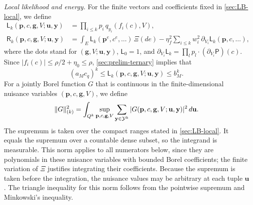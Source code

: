 \emph{Local likelihood and energy.} For the finite vectors and
coefficients fixed in \cref{sec:LB-local}, we define
\begin{align}
 \mathsf L_k(\mathbf p,c,\mathbf g,V;\mathbf u,\mathbf y)
 &=\prod_{i\le k}p_i\,q_{y_i}(f_i(c),V),
 \label{eq:LB-chart}\\
 \mathsf R_k(\mathbf p,c,\mathbf g,V;\mathbf u,\mathbf y)
 &=\int_E\mathsf L_k(\mathbf p^e,c^e,\ldots)\,\Xi(de)
 -\eta_f^2\sum_{i\le k}w_i^2\,
 \partial_{V_i}\mathsf L_k(\mathbf p,c,\ldots),
 \label{eq:LB-numerator}
\end{align}
where the dots stand for $(\mathbf g,V;\mathbf u,\mathbf y)$,
$\mathsf L_0=1$, and
$\partial_{V_i}\mathsf L_k=\prod_lp_l\cdot(\partial_{V_i}\mathsf P)(c)$.
Since $|f_i(c)|\le\rho/2+\eta_0\le\rho$, \cref{sec:prelim-ternary}
implies that
\begin{equation}\label{eq:LB-chart-bounds}
 (a_Mc_q)^k\le\mathsf L_k(\mathbf p,c,\mathbf g,V;\mathbf u,\mathbf y)
 \le b_M^k.
\end{equation}
For a jointly Borel function $G$ that is continuous in the
finite-dimensional nuisance variables $(\mathbf p,c,\mathbf g,V)$, we define
\begin{equation}\label{eq:LB-norm}
 \lVert G\rVert_{(k)}^2
 =\int_{Q^k}\sup_{\mathbf p,c,\mathbf g,V}
 \sum_{\mathbf y\in\mathcal Y^k}
 |G(\mathbf p,c,\mathbf g,V;\mathbf u,\mathbf y)|^2\,d\mathbf u.
\end{equation}
The supremum is taken over the compact ranges stated in
\cref{sec:LB-local}. It equals the supremum over a countable dense
subset, so the integrand is measurable. This norm applies to all
numerators below, since they are polynomials in these nuisance variables
with bounded Borel coefficients; the finite variation of $\Xi$ justifies
integrating their coefficients. Because the supremum is taken before the
integration, the nuisance values may be arbitrary at each tuple
$\mathbf u$. The triangle inequality for this norm follows from the
pointwise supremum and Minkowski's inequality.

